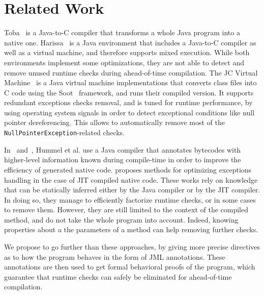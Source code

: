 
\section{Related Work}
\label{sec:relatedwork}
Toba~\cite{Proebsting1997} is a Java-to-C compiler that transforms a whole Java program into a native one. Harissa~\cite{Muller1997} is a Java environment that includes a Java-to-C compiler as well as a virtual machine, and therefore supports mixed execution. While both environments implement some optimizations, they are not able to detect and remove unused runtime checks during ahead-of-time compilation. The JC Virtual Machine~\cite{JCVM} is a Java virtual machine implementations that converts class files into C code using the Soot~\cite{Raja1999} framework, and runs their compiled version. It supports redundant exceptions checks removal, and is tuned for runtime performance, by using operating system signals in order to detect exceptional conditions like null pointer dereferencing. This allows to automatically remove most of the \texttt{NullPointerException}-related checks.

In~\cite{Hummel1997} and~\cite{Azevedo1999}, Hummel et al. use a Java compiler that annotates bytecodes with higher-level information known during compile-time in order to improve the efficiency of generated native code. \cite{Ishizaki1999} proposes methods for optimizing exceptions handling in the case of JIT compiled native code. These works rely on knowledge that can be statically inferred either by the Java compiler or by the JIT compiler. In doing so, they manage to efficiently factorize runtime checks, or in some cases to remove them. However, they are still limited to the context of the compiled method, and do not take the whole program into account. Indeed, knowing properties about a the parameters of a method can help removing further checks.

We propose to go further than these approaches, by giving more precise directives as to how the program behaves in the form of JML annotations. These annotations are then used to get formal behavioral proofs of the program, which guarantee that runtime checks can safely be eliminated for ahead-of-time compilation.

